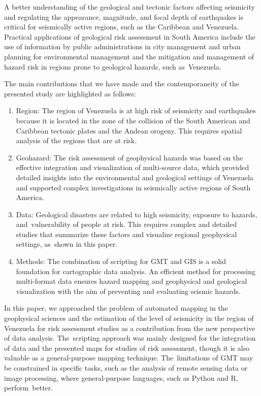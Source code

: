 \documentclass[sustainability,article,accept,pdftex,moreauthors]{Definitions/mdpi}
\begin{document}
A better understanding of the geological and tectonic factors affecting seismicity and regulating the appearance, magnitude, and focal depth of  earthquakes is critical for seismically active regions, such as the Caribbean and Venezuela. Practical applications of geological risk assessment in South America include the use of information by public administrations in city management and  urban planning for environmental management and the mitigation and management of hazard risk in regions prone to geological hazards, such as~Venezuela. 

{The main contributions that we have made and the contemporaneity %
 of the presented study are highlighted as follows:}

\begin{enumerate}
  \item Region: %
 The region of Venezuela is at high risk of seismicity and earthquakes {because it is }located in the zone of the{ collision of the }South American and Caribbean tectonic plates and the Andean orogeny. This requires spatial analysis of the regions that are at risk.
  \item Geohazard: The risk assessment of geophysical hazards was based on{ the effective }integration and visualization of  multi-source data{, }which provided detailed insights into the environmental and geological settings of Venezuela and supported complex investigations in  seismically active regions of South America. 
    \item Data: Geological disasters are related to high seismicity, exposure to hazards, and~vulnerability of people at risk. This requires complex and detailed studies that summarize these factors and visualize regional geophysical settings{, as~shown in this paper}.
   \item Methods: The combination of  scripting for GMT and GIS is {a solid foundation} for cartographic data analysis. {An efficient method for processing }multi-format data  ensures hazard mapping and geophysical and geological visualization {with the aim of} preventing and evaluating  seismic hazards.
\end{enumerate}

{In this paper, we approached the problem of automated mapping in the geophysical sciences and the estimation of the  level of seismicity in the region of Venezuela for  risk assessment studies as a contribution from the new perspective of data analysis. The~scripting approach was mainly designed for the integration of data and the presented maps for studies of risk assessment,  though it is also valuable as a general-purpose mapping technique. The~limitations of  GMT may be constrained in  specific tasks, such as the analysis of remote sensing data  or image processing, where general-purpose languages, such as Python and R, \mbox{perform better.}}
\end{document}
